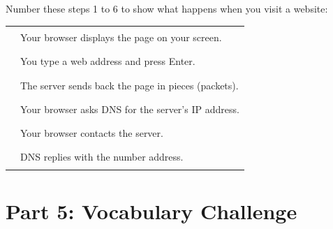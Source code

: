 \begin{tcolorbox}[enhanced,colback=SoftPurple!8,colframe=SoftPurple,arc=6pt,boxrule=1pt,
  left=10pt,right=10pt,top=8pt,bottom=8pt]

Number these steps 1 to 6 to show what happens when you visit a website:

\begin{center}
\begin{tabular}{cl}
\rule{1cm}{0.4pt} & Your browser displays the page on your screen. \\[6pt]
\rule{1cm}{0.4pt} & You type a web address and press Enter. \\[6pt]
\rule{1cm}{0.4pt} & The server sends back the page in pieces (packets). \\[6pt]
\rule{1cm}{0.4pt} & Your browser asks DNS for the server's IP address. \\[6pt]
\rule{1cm}{0.4pt} & Your browser contacts the server. \\[6pt]
\rule{1cm}{0.4pt} & DNS replies with the number address. \\[6pt]
\end{tabular}
\end{center}
\end{tcolorbox}

\vspace{12pt}

\section*{Part 5: Vocabulary Challenge}

